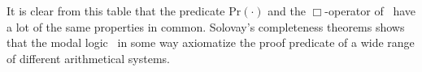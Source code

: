 \documentclass[../main.tex]{subfiles}
\begin{document}
	It is clear from this table that the predicate $\text{Pr}(\cdot)$
	and the $\Box$-operator of \GL\ have a lot of the same properties in common.
	Solovay's completeness theorems shows that the modal logic \GL\ in some
	way axiomatize the proof predicate of a wide range of different
	arithmetical systems.
\end{document}
